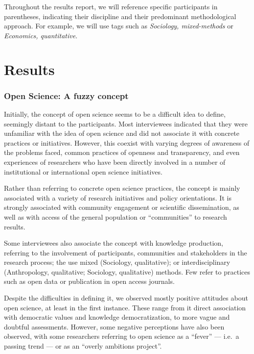 \documentclass[
  letterpaper,
  DIV=11,
  numbers=noendperiod]{scrartcl}
\begin{document}
Throughout the results report, we will reference specific participants
in parentheses, indicating their discipline and their predominant
methodological approach. For example, we will use tags such as
\emph{Sociology, mixed-methods} or \emph{Economics, quantitative}.

\hypertarget{results}{%
\section{Results}\label{results}}

\hypertarget{open-science-a-fuzzy-concept}{%
\subsubsection{\texorpdfstring{\textbf{Open Science: A fuzzy
concept}}{Open Science: A fuzzy concept}}\label{open-science-a-fuzzy-concept}}

Initially, the concept of open science seems to be a difficult idea to
define, seemingly distant to the participants. Most interviewees
indicated that they were unfamiliar with the idea of open science and
did not associate it with concrete practices or initiatives. However,
this coexist with varying degrees of awareness of the problems faced,
common practices of openness and transparency, and even experiences of
researchers who have been directly involved in a number of institutional
or international open science initiatives.

Rather than referring to concrete open science practices, the concept is
mainly associated with a variety of research initiatives and policy
orientations. It is strongly associated with community engagement or
scientific dissemination, as well as with access of the general
population or ``communities'' to research results.

Some interviewees also associate the concept with knowledge production,
referring to the involvement of participants, communities and
stakeholders in the research process; the use mixed (Sociology,
qualitative); or interdisciplinary (Anthropology, qualitative;
Sociology, qualitative) methods. Few refer to practices such as open
data or publication in open access journals.

Despite the difficulties in defining it, we observed mostly positive
attitudes about open science, at least in the first instance. These
range from it direct association with democratic values and knowledge
democratization, to more vague and doubtful assessments. However, some
negative perceptions have also been observed, with some researchers
referring to open science as a ``fever'' --- i.e.~a passing trend --- or
as an ``overly ambitions project''.
\end{document}
